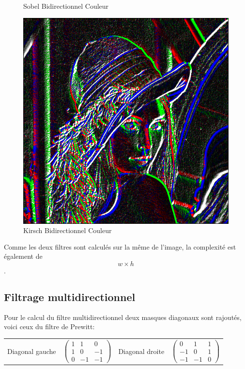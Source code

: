 \documentclass[11pt]{article}
\begin{document}
\begin{figure}[H]
\begin{minipage}[c]{.3\linewidth}
			\caption{Sobel Bidirectionnel Couleur}
			\label{fig:SobelBidirectionnelCouleur}
		\end{minipage}\hfill
		\begin{minipage}[c]{.3\linewidth}
		\centering
		\includegraphics[scale=0.25]{Image/filtreKirschBidirectionnelCouleur.png}
		\caption{Kirsch Bidirectionnel Couleur}
		\label{fig:KirschBidirectionnelCouleur}
		\end{minipage}
	\end{figure}


	Comme les deux filtres sont calculés sur la même de l'image, la complexité est également de \[w \times h\].

	\subsection{Filtrage multidirectionnel}

	Pour le calcul du filtre multidirectionnel deux masques diagonaux sont rajoutés, voici ceux du filtre de Prewitt:
	\\
	\begin{tabular}{cccc}
		Diagonal gauche &
		$
		\begin{pmatrix}
			1 & 1 & 0 \\
			1 & 0 & -1 \\
			0 & -1 & -1
		\end{pmatrix}
		$
		& Diagonal droite &
		$
		\begin{pmatrix}
		0 & 1 & 1 \\
		-1 & 0 & 1 \\
		-1 & -1 & 0
		\end{pmatrix}
		$
	\end{tabular}
\end{document}
